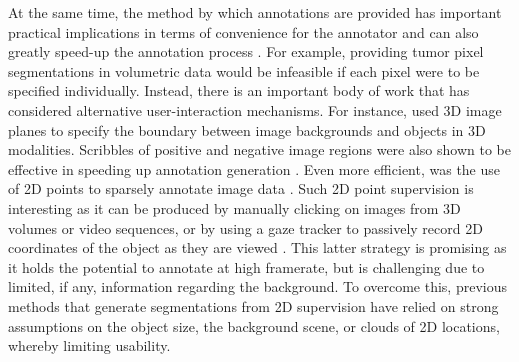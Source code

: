 At the same time, the method by which annotations are provided has important practical implications in terms of convenience for the annotator and can also greatly speed-up the annotation process \cite{ferreira12}. For example, providing tumor pixel segmentations in volumetric data would be infeasible if each pixel were to be specified individually. Instead, there is an important body of work that has considered alternative user-interaction mechanisms. For instance, \cite{KonSznFua15} used 3D image planes to specify the boundary between image backgrounds and objects in 3D modalities. Scribbles of positive and negative image regions were also shown to be effective in speeding up annotation generation \cite{roberts11}. Even more efficient, was the use of 2D points to sparsely annotate image data \cite{bromiley14,bearman16}. Such 2D point supervision is interesting as it can be produced by manually clicking on images from 3D volumes or video sequences, or by using a gaze tracker to passively record 2D coordinates of the object as they are viewed \cite{yunpeng13,khosravan16,lejeune17}. This latter strategy is promising as it holds the potential to annotate at high framerate, but is challenging due to limited, if any, information regarding the background. To overcome this, previous methods that generate segmentations from 2D supervision have relied on strong assumptions on the object size, the background scene, or clouds of 2D locations, whereby limiting usability.

